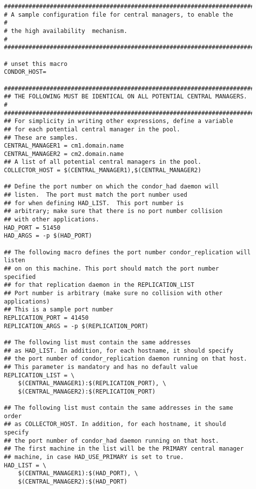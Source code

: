 \footnotesize
\begin{verbatim}
##########################################################################
# A sample configuration file for central managers, to enable the        #
# the high availability  mechanism.                                      #
##########################################################################

# unset this macro 
CONDOR_HOST=

#########################################################################
## THE FOLLOWING MUST BE IDENTICAL ON ALL POTENTIAL CENTRAL MANAGERS.   # 
#########################################################################
## For simplicity in writing other expressions, define a variable
## for each potential central manager in the pool. 
## These are samples.
CENTRAL_MANAGER1 = cm1.domain.name
CENTRAL_MANAGER2 = cm2.domain.name
## A list of all potential central managers in the pool.
COLLECTOR_HOST = $(CENTRAL_MANAGER1),$(CENTRAL_MANAGER2)

## Define the port number on which the condor_had daemon will
## listen.  The port must match the port number used
## for when defining HAD_LIST.  This port number is
## arbitrary; make sure that there is no port number collision
## with other applications.
HAD_PORT = 51450
HAD_ARGS = -p $(HAD_PORT)

## The following macro defines the port number condor_replication will listen
## on on this machine. This port should match the port number specified
## for that replication daemon in the REPLICATION_LIST
## Port number is arbitrary (make sure no collision with other applications)
## This is a sample port number
REPLICATION_PORT = 41450
REPLICATION_ARGS = -p $(REPLICATION_PORT)

## The following list must contain the same addresses
## as HAD_LIST. In addition, for each hostname, it should specify 
## the port number of condor_replication daemon running on that host.
## This parameter is mandatory and has no default value
REPLICATION_LIST = \
	$(CENTRAL_MANAGER1):$(REPLICATION_PORT), \
	$(CENTRAL_MANAGER2):$(REPLICATION_PORT)

## The following list must contain the same addresses in the same order 
## as COLLECTOR_HOST. In addition, for each hostname, it should specify 
## the port number of condor_had daemon running on that host.
## The first machine in the list will be the PRIMARY central manager
## machine, in case HAD_USE_PRIMARY is set to true.
HAD_LIST = \
	$(CENTRAL_MANAGER1):$(HAD_PORT), \
	$(CENTRAL_MANAGER2):$(HAD_PORT)



\end{verbatim}
